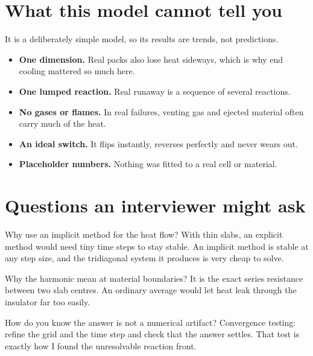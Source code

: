 \documentclass[11pt]{article}
\begin{document}
\section{What this model cannot tell you}

\begin{idea}
It is a deliberately simple model, so its results are trends, not predictions.
\end{idea}

\begin{itemize}
  \item \textbf{One dimension.} Real packs also lose heat sideways, which is why end
        cooling mattered so much here.
  \item \textbf{One lumped reaction.} Real runaway is a sequence of several reactions.
  \item \textbf{No gases or flames.} In real failures, venting gas and ejected material
        often carry much of the heat.
  \item \textbf{An ideal switch.} It flips instantly, reverses perfectly and never wears
        out.
  \item \textbf{Placeholder numbers.} Nothing was fitted to a real cell or material.
\end{itemize}

\section{Questions an interviewer might ask}

\begin{qa}{Why use an implicit method for the heat flow?}
With thin slabs, an explicit method would need tiny time steps to stay stable. An
implicit method is stable at any step size, and the tridiagonal system it produces is
very cheap to solve.
\end{qa}

\begin{qa}{Why the harmonic mean at material boundaries?}
It is the exact series resistance between two slab centres. An ordinary average would
let heat leak through the insulator far too easily.
\end{qa}

\begin{qa}{How do you know the answer is not a numerical artifact?}
Convergence testing: refine the grid and the time step and check that the answer settles.
That test is exactly how I found the unresolvable reaction front.
\end{qa}
\end{document}
